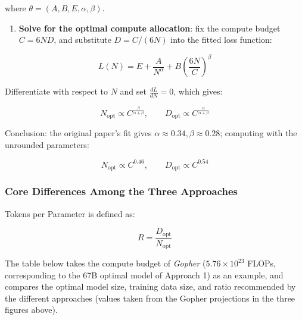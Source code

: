 \documentclass[
  english,
  11pt,
  a4paper,
]{article}
\providecommand{\tightlist}{%
  \setlength{\itemsep}{0pt}\setlength{\parskip}{0pt}}
\newenvironment{NotesFormula}{%
  \par\noindent\begin{minipage}{\linewidth}%
  \setlength{\parindent}{2em}%
  \setlength{\parskip}{0.35em}%
}{\end{minipage}\par}
\begin{document}
where \(\theta=(A,B,E,\alpha,\beta)\).

\begin{enumerate}
\def\labelenumi{\arabic{enumi}.}
\setcounter{enumi}{2}
\tightlist
\item
  \textbf{Solve for the optimal compute allocation}: fix the compute
  budget \(C=6ND\), and substitute \(D=C/(6N)\) into the fitted loss
  function:
\end{enumerate}

\[L(N)=E+\frac{A}{N^\alpha}+B\left(\frac{6N}{C}\right)^\beta\]

\begin{NotesFormula}

Differentiate with respect to \(N\) and set \(\frac{dL}{dN}=0\), which
gives:

\[N_{\mathrm{opt}}\propto C^{\frac{\beta}{\alpha+\beta}},\qquad
D_{\mathrm{opt}}\propto C^{\frac{\alpha}{\alpha+\beta}}\]

\end{NotesFormula}

\begin{NotesFormula}

Conclusion: the original paper's fit gives
\(\alpha\approx0.34,\beta\approx0.28\); computing with the unrounded
parameters:

\[\boxed{N_{\mathrm{opt}}\propto C^{0.46},\qquad D_{\mathrm{opt}}\propto C^{0.54}}\]

\end{NotesFormula}

\subsubsection{Core Differences Among the Three
Approaches}\label{core-differences-among-the-three-approaches}

\begin{NotesFormula}

Tokens per Parameter is defined as:

\[\boxed{R=\frac{D_{\mathrm{opt}}}{N_{\mathrm{opt}}}}\]

\end{NotesFormula}

The table below takes the compute budget of \emph{Gopher}
(\(5.76\times10^{23}\) FLOPs, corresponding to the 67B optimal model of
Approach 1) as an example, and compares the optimal model size, training
data size, and ratio recommended by the different approaches (values
taken from the Gopher projections in the three figures above).
\end{document}
